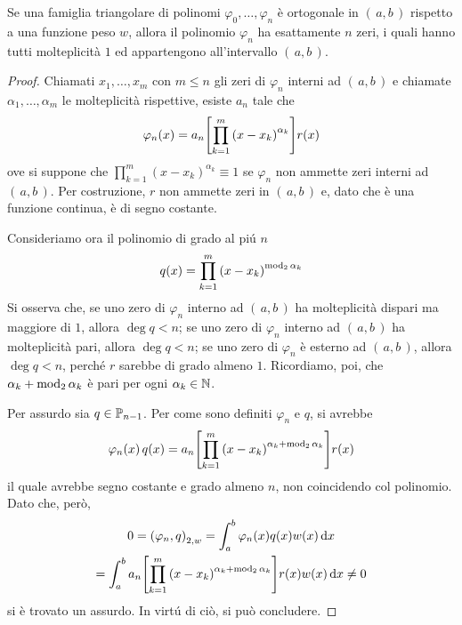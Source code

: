 	\begin{teorema}[Christoffel]
		Se una famiglia triangolare di polinomi \(\varphi_0, \dots, \varphi_n\) è ortogonale in \((\, a, b \,)\) rispetto a una funzione peso \(w\), allora il polinomio \(\varphi_n\) ha esattamente \(n\) zeri, i quali hanno tutti molteplicità \(1\) ed appartengono all'intervallo \((\, a, b \,)\).
	\end{teorema}

	\begin{proof}
		Chiamati \(x_1, \dots, x_m\) con \(m \le n\) gli zeri di \(\varphi_n\) interni ad \((\, a, b \,)\) e chiamate \(\alpha_1, \dots, \alpha_m\) le molteplicità rispettive, esiste \(a_n\) tale che
		\begin{equation*}
			\varphi_n (x) = a_n \qty[\prod_{k = 1}^m \qty(x - x_k)^{\alpha_k}] r (x)
		\end{equation*}
		ove si suppone che \(\prod_{k = 1}^m (x - x_k)^{\alpha_k} \equiv 1\) se \(\varphi_n\) non ammette zeri interni ad \((\, a, b \,)\). Per costruzione, \(r\) non ammette zeri in \((\, a, b \,)\) e, dato che è una funzione continua, è di segno costante.
		
		Consideriamo ora il polinomio di grado al piú \(n\)
		\begin{equation*}
			q (x) = \prod_{k = 1}^m \qty(x - x_k)^{\varmod_2 \alpha_k}
		\end{equation*}
		Si osserva che, se uno zero di \(\varphi_n\) interno ad \((\, a, b \,)\) ha molteplicità dispari ma maggiore di \(1\), allora \(\deg q < n\); se uno zero di \(\varphi_n\) interno ad \((\, a, b \,)\) ha molteplicità pari, allora \(\deg q < n\); se uno zero di \(\varphi_n\) è esterno ad \((\, a, b \,)\), allora \(\deg q < n\), perché \(r\) sarebbe di grado almeno \(1\). Ricordiamo, poi, che \(\alpha_k + \varmod_2 \alpha_k\) è pari per ogni \(\alpha_k \in \N\).
		
		Per assurdo sia \(q \in \P_{n - 1}\). Per come sono definiti \(\varphi_n\) e \(q\), si avrebbe
		\begin{equation*}
			\varphi_n (x) \, q(x) = a_n \qty[\prod_{k = 1}^m \qty(x - x_k)^{\alpha_k + \varmod_2 \alpha_k}] r (x)
		\end{equation*}
		il quale avrebbe segno costante e grado almeno \(n\), non coincidendo col polinomio. Dato che, però,
		\begin{multline*}
			0 = \qty(\varphi_n, q)_{2, w} = \int_a^b \varphi_n (x) q (x) w (x) \dd{x} \\
			= \int_a^b a_n \qty[\prod_{k = 1}^m \qty(x - x_k)^{\alpha_k + \varmod_2 \alpha_k}] r (x) w (x) \dd{x} \ne 0
		\end{multline*}
		si è trovato un assurdo. In virtú di ciò, si può concludere.
	\end{proof}

